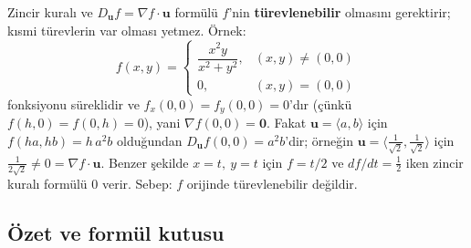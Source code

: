 \begin{dikkat}
Zincir kuralı ve $D_{\mathbf u}f=\nabla f\cdot\mathbf u$ formülü $f$'nin \textbf{türevlenebilir} olmasını gerektirir;
kısmi türevlerin var olması yetmez. Örnek:
\[
f(x,y)=\begin{cases}\dfrac{x^2y}{x^2+y^2}, & (x,y)\ne(0,0)\\[4pt] 0, & (x,y)=(0,0)\end{cases}
\]
fonksiyonu süreklidir ve $f_x(0,0)=f_y(0,0)=0$'dır (çünkü $f(h,0)=f(0,h)=0$), yani $\nabla f(0,0)=\mathbf 0$. Fakat
$\mathbf u=\langle a,b\rangle$ için $f(ha,hb)=h\,a^2b$ olduğundan $D_{\mathbf u}f(0,0)=a^2b$'dir; örneğin
$\mathbf u=\langle\frac{1}{\sqrt2},\frac{1}{\sqrt2}\rangle$ için $\frac{1}{2\sqrt2}\ne0=\nabla f\cdot\mathbf u$. Benzer şekilde
$x=t,\ y=t$ için $f=t/2$ ve $df/dt=\frac12$ iken zincir kuralı formülü $0$ verir. Sebep: $f$ orijinde türevlenebilir değildir.
\end{dikkat}

\subsection{Özet ve formül kutusu}

